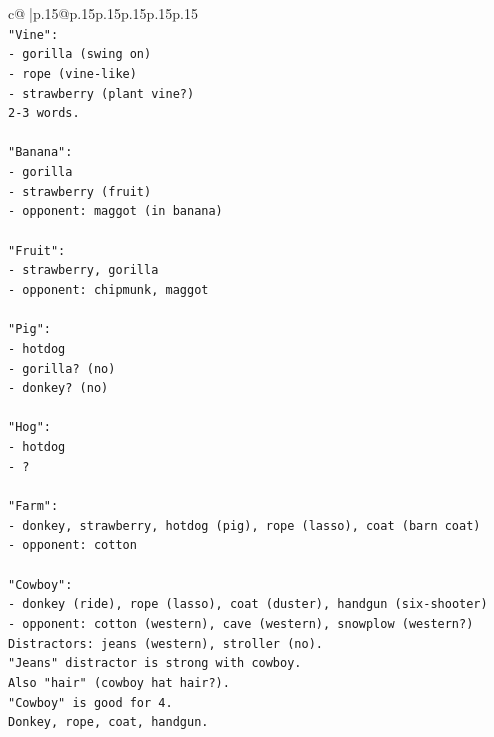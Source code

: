 \documentclass{article}
\begin{document}
{\begin{supertabular}{c@{$\;$}|p{.15\linewidth}@{}p{.15\linewidth}p{.15\linewidth}p{.15\linewidth}p{.15\linewidth}p{.15\linewidth}}
{{{\\ 
\texttt{"Vine":} \\
\texttt{{-} gorilla (swing on)} \\
\texttt{{-} rope (vine{-}like)} \\
\texttt{{-} strawberry (plant vine?)} \\
\texttt{2{-}3 words.} \\
\\ 
\texttt{"Banana":} \\
\texttt{{-} gorilla} \\
\texttt{{-} strawberry (fruit)} \\
\texttt{{-} opponent: maggot (in banana)} \\
\\ 
\texttt{"Fruit":} \\
\texttt{{-} strawberry, gorilla} \\
\texttt{{-} opponent: chipmunk, maggot} \\
\\ 
\texttt{"Pig":} \\
\texttt{{-} hotdog} \\
\texttt{{-} gorilla? (no)} \\
\texttt{{-} donkey? (no)} \\
\\ 
\texttt{"Hog":} \\
\texttt{{-} hotdog} \\
\texttt{{-} ?} \\
\\ 
\texttt{"Farm":} \\
\texttt{{-} donkey, strawberry, hotdog (pig), rope (lasso), coat (barn coat)} \\
\texttt{{-} opponent: cotton} \\
\\ 
\texttt{"Cowboy":} \\
\texttt{{-} donkey (ride), rope (lasso), coat (duster), handgun (six{-}shooter)} \\
\texttt{{-} opponent: cotton (western), cave (western), snowplow (western?)} \\
\texttt{Distractors: jeans (western), stroller (no).} \\
\texttt{"Jeans" distractor is strong with cowboy.} \\
\texttt{Also "hair" (cowboy hat hair?).} \\
\texttt{"Cowboy" is good for 4.} \\
\texttt{Donkey, rope, coat, handgun.} \\
}}}
\end{supertabular}}
\end{document}
